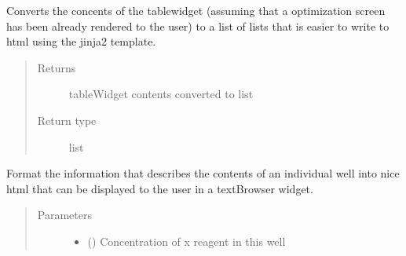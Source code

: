 \documentclass[letterpaper,10pt,english]{sphinxmanual}
\begin{document}
\begin{fulllineitems}
\begin{fulllineitems}
\end{fulllineitems}


\begin{fulllineitems}
\label{\detokenize{polo.widgets:polo.widgets.optimize_widget.OptimizeWidget.make_plate_list}}
Converts the concents of the tablewidget (assuming that a optimization
screen has been already rendered to the user) to a list of lists that
is easier to write to html using the jinja2 template.
\begin{quote}\begin{description}
\item[{Returns}] \leavevmode
tableWidget contents converted to list

\item[{Return type}] \leavevmode
list

\end{description}\end{quote}

\end{fulllineitems}


\begin{fulllineitems}
\label{\detokenize{polo.widgets:polo.widgets.optimize_widget.OptimizeWidget.make_well_html}}
Format the information that describes the contents of an
individual well into nice html that can be displayed to the user
in a textBrowser widget.
\begin{quote}\begin{description}
\item[{Parameters}] \leavevmode\begin{itemize}
\item {} 
 ({\hyperref[\detokenize{polo.crystallography:polo.crystallography.cocktail.SignedValue}]{}}) \textendash{} Concentration of x reagent in this well


\end{itemize}
\end{description}
\end{quote}
\end{fulllineitems}
\end{fulllineitems}
\end{document}
